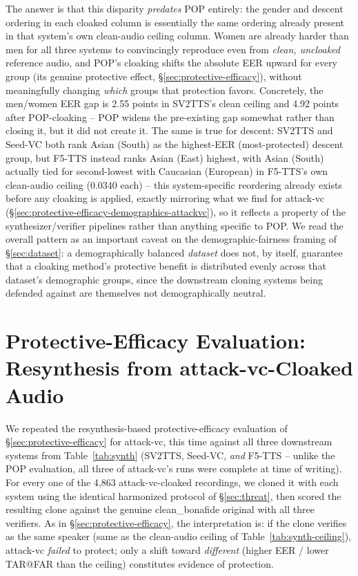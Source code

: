 \documentclass[11pt]{article}
\begin{document}
The answer is that this disparity \emph{predates} POP entirely: the
gender and descent ordering in each cloaked column is essentially the
same ordering already present in that system's own clean-audio
ceiling column. Women are already harder than men for all three
systems to convincingly reproduce even from \emph{clean, uncloaked}
reference audio, and POP's cloaking shifts the absolute EER upward for
every group (its genuine protective effect, \S\ref{sec:protective-efficacy}),
without meaningfully changing \emph{which} groups that protection
favors. Concretely, the men/women EER gap is 2.55 points in SV2TTS's
clean ceiling and 4.92 points after POP-cloaking -- POP widens the
pre-existing gap somewhat rather than closing it, but it did not
create it. The same is true for descent: SV2TTS and Seed-VC both rank
Asian (South) as the highest-EER (most-protected) descent group, but
F5-TTS instead ranks Asian (East) highest, with Asian (South) actually
tied for second-lowest with Caucasian (European) in F5-TTS's own
clean-audio ceiling (0.0340 each) -- this system-specific reordering
already exists before any cloaking is applied, exactly mirroring what
we find for attack-vc
(\S\ref{sec:protective-efficacy-demographics-attackvc}), so it
reflects a property of the synthesizer/verifier pipelines rather than
anything specific to POP. We read the overall pattern as an important
caveat on the demographic-fairness framing of \S\ref{sec:dataset}: a
demographically balanced \emph{dataset} does not, by itself, guarantee
that a cloaking method's protective benefit is distributed evenly
across that dataset's demographic groups, since the downstream
cloning systems being defended against are themselves not
demographically neutral.

\section{Protective-Efficacy Evaluation: Resynthesis from attack-vc-Cloaked Audio}
\label{sec:protective-efficacy-attackvc}

We repeated the resynthesis-based protective-efficacy evaluation of
\S\ref{sec:protective-efficacy} for attack-vc, this time against all
three downstream systems from Table~\ref{tab:synth} (SV2TTS, Seed-VC,
\emph{and} F5-TTS -- unlike the POP evaluation, all three of
attack-vc's runs were complete at time of writing). For every one of
the 4,863 attack-vc-cloaked recordings, we cloned it with each system
using the identical harmonized protocol of \S\ref{sec:threat}, then
scored the resulting clone against the genuine clean\_bonafide
original with all three verifiers. As in \S\ref{sec:protective-efficacy},
the interpretation is: if the clone verifies as the same speaker (same
as the clean-audio ceiling of Table~\ref{tab:synth-ceiling}), attack-vc
\emph{failed} to protect; only a shift toward \emph{different} (higher
EER / lower TAR@FAR than the ceiling) constitutes evidence of
protection.
\end{document}
